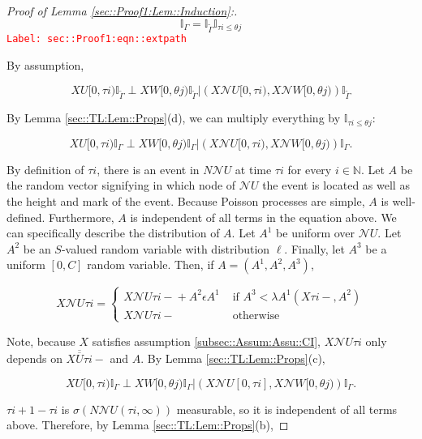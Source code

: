 \documentclass[12pt]{article}
\newcommand{\mb}{\mathbb}
\newcommand{\mc}{\mathcal}
\newcommand{\ov}{\overline}
\newcommand{\te}{\text}
\newcommand{\ep}{\epsilon}
\newcommand{\tr}{\textcolor{red}}
\newcommand{\labe}[1]{\tr{\texttt{Label: #1}}}
\renewcommand{\U}{U}							%
\newcommand{\UU}{W}								%
\renewcommand{\S}{S}							%
\newcommand{\ev}{\ep}							%
\newcommand{\X}{X}								%
\newcommand{\neigh}{\mc{N}}						%
\newcommand{\cl}{\ov}							%
\newcommand{\const}{C}							%
\newcommand{\poiss}{N}							%
\newcommand{\Sm}{\ell}							%
\newcommand{\rate}{\lambda}						%
\newcommand{\alt}[1]{\widetilde{#1}}			%
\newcommand{\rt}{\tau}							%
\newcommand{\rtt}{\theta}						%
\newcommand{\apath}{\Gamma}						%
\newcommand{\rv}{A}								%
\begin{document}
\begin{proof}[Proof of Lemma \ref{sec::Proof1:Lem::Induction}:]
\begin{equation}
\mb{I}_{\apath{}} = \mb{I}_{\alt{\apath{}}}\mb{I}_{\rt{i} \leq \rtt{j}}
\label{sec::Proof1:eqn::extpath}
\end{equation}
\labe{sec::Proof1:eqn::extpath}

By assumption,

\[\X{\U}{[0,\rt{i})}\mb{I}_{\alt{\apath{}}}\perp \X{\UU}{[0,\rtt{j})}\mb{I}_{\alt{\apath{}}}|\left(\X{\neigh{\U}}{[0,\rt{i})},\X{\neigh{\UU}}{[0,\rtt{j})}\right)\mb{I}_{\alt{\apath{}}}\]

By Lemma \ref{sec::TL:Lem::Props}(d), we can multiply everything by \(\mb{I}_{\rt{i} \leq \rtt{j}}\):

\[\X{\U}{[0,\rt{i})}\mb{I}_{\apath{}}\perp \X{\UU}{[0,\rtt{j})}\mb{I}_{\apath{}}|\left(\X{\neigh{\U}}{[0,\rt{i})},\X{\neigh{\UU}}{[0,\rtt{j})}\right)\mb{I}_{\apath{}}.\]

By definition of \(\rt{i}\), there is an event in \(\poiss{\neigh{\U}}\) at time \(\rt{i}\) for every \(i \in \mb{ N}\). Let \(\rv\) be the random vector signifying in which node of \(\neigh{\U}\) the event is located as well as the height and mark of the event. Because Poisson processes are simple, \(\rv\) is well-defined. Furthermore, \(\rv\) is independent of all terms in the equation above. We can specifically describe the distribution of \(\rv\). Let \(\rv^1\) be uniform over \(\neigh{\U}\). Let \(\rv^2\) be an \(\S\)-valued random variable with distribution \(\Sm\). Finally, let \(\rv^3\) be a uniform \([0,\const{}]\) random variable. Then, if \(\rv=(\rv^1,\rv^2,\rv^3)\),

\[\X{\neigh{\U}}{\rt{i}} = \begin{cases}
\X{\neigh{\U}}{\rt{i}-} + \rv^2\ev{\rv^1} &\te{ if } \rv^3< \rate{\rv^1}(\X{}{\rt{i}-}, \rv^2)\\
\X{\neigh{\U}}{\rt{i}-} &\te{ otherwise}
\end{cases}\]

Note, because \(\X{}{}\) satisfies assumption \ref{subsec::Assum:Assu::CI}, \(\X{\neigh{\U}}{\rt{i}}\) only depends on \(\X{\cl{\cl{\U}}}{\rt{i}-}\) and \(\rv\). By Lemma \ref{sec::TL:Lem::Props}(c), 

\[\X{\U}{[0,\rt{i})}\mb{I}_{\apath{}}\perp \X{\UU}{[0,\rtt{j})}\mb{I}_{\apath{}}|\left(\X{\neigh{\U}}{[0,\rt{i}]},\X{\neigh{\UU}}{[0,\rtt{j})}\right)\mb{I}_{\apath{}}.\]

\(\rt{i+1} - \rt{i}\) is \(\sigma(\poiss{\neigh{\U}}(\rt{i},\infty))\) measurable, so it is independent of all terms above. Therefore, by Lemma \ref{sec::TL:Lem::Props}(b),


\end{proof}
\end{document}
